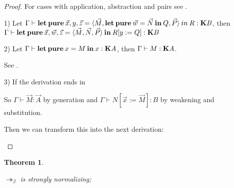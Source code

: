 \documentclass[a4paper]{article}
\newtheorem{theorem}{Theorem}
\begin{document}
\begin{proof}
For cases with application, abstraction and pairs see \cite{Morten} \cite{Pierce}.

1)
  Let $\Gamma \vdash {\bf let \: pure \:} \vec{x}, y, \vec{z}  = \langle \vec{M}, {\bf let \: pure \: } \vec{w} = \vec{N} {\bf \: in \: } Q, \vec{P} \rangle {\: in \:} R : {\bf K}B$,
  then $\Gamma \vdash {\bf let \: pure \:} \vec{x}, \vec{w}, \vec{z} = \langle \vec{M}, \vec{N}, \vec{P} \rangle \: { \bf in } \: R [y := Q] : {\bf K}B$

2) Let $\Gamma \vdash {\bf let \: pure \:} x = M {\: \bf in \: } x : {\bf K}A$, then $\Gamma \vdash M : {\bf K}A$.

See \cite{ModalK}.

3) If the derivation ends in

\begin{prooftree}
\end{prooftree}

So $\Gamma \vdash \vec{M} : \vec{A}$ by generation and $\Gamma \vdash N [\vec{x} := \vec{M}] : B$ by weakening and substitution.

Then we can transform this into the next derivation:

\begin{prooftree}
\end{prooftree}


\end{proof}

\begin{theorem}
  $ $

  $\twoheadrightarrow_{\beta}$ is strongly normalizing;
\end{theorem}
\end{document}
